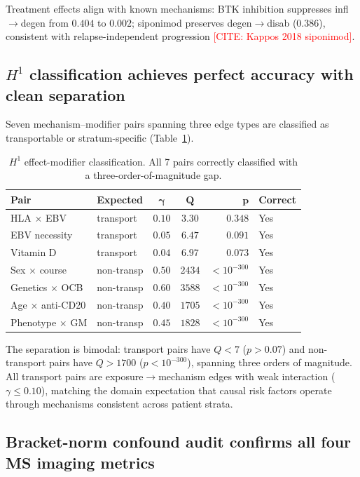 \documentclass[11pt]{article}
\newcommand{\misscite}[1]{\textcolor{red}{[CITE: #1]}}
\begin{document}
Treatment effects align with known mechanisms: BTK inhibition suppresses infl$\to$degen from $0.404$ to $0.002$; siponimod preserves degen$\to$disab ($0.386$), consistent with relapse-independent progression \misscite{Kappos 2018 siponimod}.

\subsection{$H^1$ classification achieves perfect accuracy with clean separation}
\label{sec:res-h1}

Seven mechanism--modifier pairs spanning three edge types are classified as transportable or stratum-specific (Table~\ref{tab:h1}).

\begin{table}[t]
\centering
\caption{$H^1$ effect-modifier classification. All 7 pairs correctly classified with a three-order-of-magnitude gap.}
\label{tab:h1}
\small
\begin{tabular}{@{}llccrl@{}}
\toprule
\textbf{Pair} & \textbf{Expected} & $\boldsymbol{\gamma}$ & $\boldsymbol{Q}$ & $\boldsymbol{p}$ & \textbf{Correct} \\
\midrule
HLA $\times$ EBV & transport & $0.10$ & $3.30$ & $0.348$ & Yes \\
EBV necessity & transport & $0.05$ & $6.47$ & $0.091$ & Yes \\
Vitamin D & transport & $0.04$ & $6.97$ & $0.073$ & Yes \\
\midrule
Sex $\times$ course & non-transp & $0.50$ & $2434$ & $< 10^{-300}$ & Yes \\
Genetics $\times$ OCB & non-transp & $0.60$ & $3588$ & $< 10^{-300}$ & Yes \\
Age $\times$ anti-CD20 & non-transp & $0.40$ & $1705$ & $< 10^{-300}$ & Yes \\
Phenotype $\times$ GM & non-transp & $0.45$ & $1828$ & $< 10^{-300}$ & Yes \\
\bottomrule
\end{tabular}
\end{table}

The separation is bimodal: transport pairs have $Q < 7$ ($p > 0.07$) and non-transport pairs have $Q > 1700$ ($p < 10^{-300}$), spanning three orders of magnitude.
All transport pairs are exposure$\to$mechanism edges with weak interaction ($\gamma \leq 0.10$), matching the domain expectation that causal risk factors operate through mechanisms consistent across patient strata.

\subsection{Bracket-norm confound audit confirms all four MS imaging metrics}
\label{sec:res-bracket}
\end{document}
